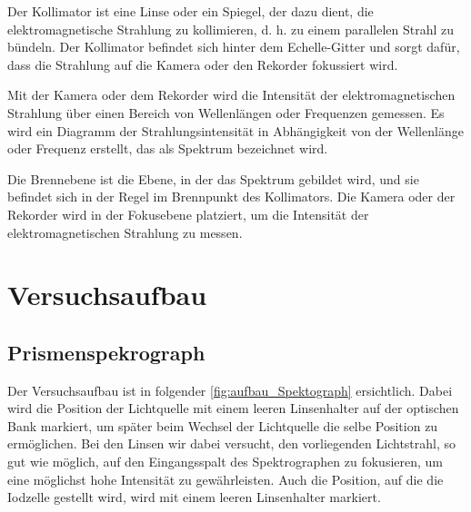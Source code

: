 \documentclass[12pt,english,ngerman]{scrartcl}
\begin{document}
Der Kollimator ist eine Linse oder ein Spiegel, der dazu dient, die elektromagnetische Strahlung zu kollimieren, d. h. zu einem parallelen Strahl zu bündeln. Der Kollimator befindet sich hinter dem Echelle-Gitter und sorgt dafür, dass die Strahlung auf die Kamera oder den Rekorder fokussiert wird.

Mit der Kamera oder dem Rekorder wird die Intensität der elektromagnetischen Strahlung über einen Bereich von Wellenlängen oder Frequenzen gemessen. Es wird ein Diagramm der Strahlungsintensität in Abhängigkeit von der Wellenlänge oder Frequenz erstellt, das als Spektrum bezeichnet wird.

Die Brennebene ist die Ebene, in der das Spektrum gebildet wird, und sie befindet sich in der Regel im Brennpunkt des Kollimators. Die Kamera oder der Rekorder wird in der Fokusebene platziert, um die Intensität der elektromagnetischen Strahlung zu messen.




\section{Versuchsaufbau} \label{sec:aufbau}

\subsection{Prismenspekrograph}

Der Versuchsaufbau ist in folgender \autoref{fig:aufbau_Spektograph} ersichtlich. Dabei wird die Position der Lichtquelle
mit einem leeren Linsenhalter auf der optischen Bank markiert, um später beim Wechsel der Lichtquelle die selbe Position zu
ermöglichen. Bei den Linsen wir dabei versucht, den vorliegenden Lichtstrahl, so gut wie möglich, auf den Eingangsspalt des
Spektrographen zu fokusieren, um eine möglichst hohe Intensität zu gewährleisten. Auch die Position, auf die die Iodzelle
gestellt wird, wird mit einem leeren Linsenhalter markiert.
\end{document}
